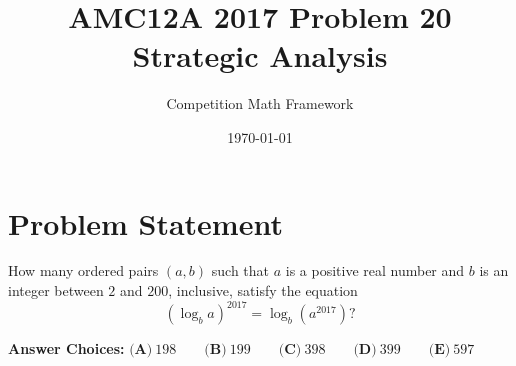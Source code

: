 \documentclass[]{article}
\begin{document}
\title{AMC12A 2017 Problem 20 Strategic Analysis}
\author{Competition Math Framework}
\date{\today}
\maketitle

\section*{Problem Statement}

How many ordered pairs $(a,b)$ such that $a$ is a positive real number and $b$ is an integer between $2$ and $200$, inclusive, satisfy the equation 
\[(\log_b a)^{2017}=\log_b(a^{2017})?\]

\textbf{Answer Choices:} 
$\textbf{(A)}\ 198\qquad\textbf{(B)}\ 199\qquad\textbf{(C)}\ 398\qquad\textbf{(D)}\ 399\qquad\textbf{(E)}\ 597$
\end{document}
